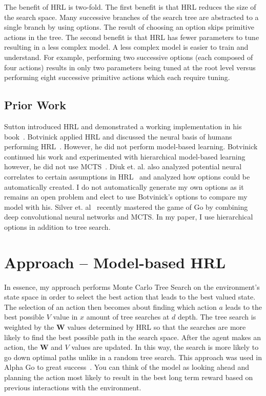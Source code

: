 The benefit of HRL is two-fold. The first benefit is that HRL reduces the size of the search space. Many successive branches of the search tree are abstracted to a single branch by using options. The result of choosing an option skips primitive actions in the tree. The second benefit is that HRL has fewer parameters to tune resulting in a less complex model. A less complex model is easier to train and understand. For example, performing two successive options (each composed of four actions) results in only two parameters being tuned at the root level versus performing eight successive primitive actions which each require tuning.

\subsection{Prior Work}
Sutton introduced HRL and demonstrated a working implementation in his book~\cite{sutton1999between}. Botvinick applied HRL and discussed the neural basis of humans performing HRL~\cite{botvinick2009hierarchically}. However, he did not perform model-based learning.  Botvinick continued his work and experimented with hierarchical model-based learning however, he did not use MCTS~\cite{Botvinick2014Model}. Diuk et. al. also analyzed potential neural correlates to certain assumptions in HRL~\cite{diuk2013divide} and analyzed how options could be automatically created. I do not automatically generate my own options as it remains an open problem and elect to use Botvinick's options to compare my model with his. Silver et. al~\cite{silver2016mastering} recently mastered the game of Go by combining deep convolutional neural networks and MCTS. In my paper, I use hierarchical options in addition to tree search.

\section{Approach -- Model-based HRL}

In essence, my approach performs Monte Carlo Tree Search on the environment's state space in order to select the best action that leads to the best valued state. The selection of an action then becomes about finding which action $a$ leads to the best possible $V$ value in $x$ amount of tree searches at $d$ depth. The tree search is weighted by the \textbf{W} values determined by HRL so that the searches are more likely to find the best possible path in the search space. After the agent makes an action, the \textbf{W} and $V$ values are updated. In this way, the search is more likely to go down optimal paths unlike in a random tree search. This approach was used in Alpha Go to great success~\cite{silver2016mastering}. You can think of the model as looking ahead and planning the action most likely to result in the best long term reward based on previous interactions with the environment.

